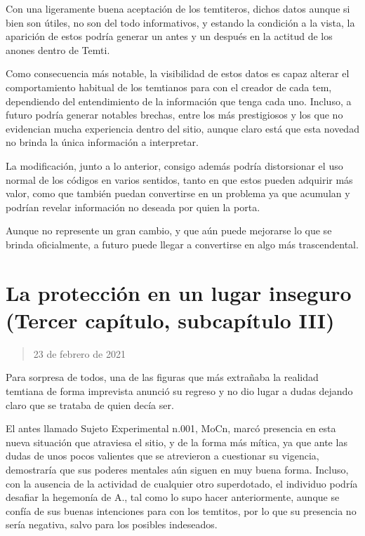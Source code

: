 \documentclass[
  spanish,
]{book}
\begin{document}
Con una ligeramente buena aceptación de los temtiteros, dichos datos aunque si bien son útiles, no son del todo informativos, y estando la condición a la vista, la aparición de estos podría generar un antes y un después en la actitud de los anones dentro de Temti.

Como consecuencia más notable, la visibilidad de estos datos es capaz alterar el comportamiento habitual de los temtianos para con el creador de cada tem, dependiendo del entendimiento de la información que tenga cada uno. Incluso, a futuro podría generar notables brechas, entre los más prestigiosos y los que no evidencian mucha experiencia dentro del sitio, aunque claro está que esta novedad no brinda la única información a interpretar.

La modificación, junto a lo anterior, consigo además podría distorsionar el uso normal de los códigos en varios sentidos, tanto en que estos pueden adquirir más valor, como que también puedan convertirse en un problema ya que acumulan y podrían revelar información no deseada por quien la porta.

Aunque no represente un gran cambio, y que aún puede mejorarse lo que se brinda oficialmente, a futuro puede llegar a convertirse en algo más trascendental.

\hypertarget{la-protecciuxf3n-en-un-lugar-inseguro-tercer-capuxedtulo-subcapuxedtulo-iii}{%
\section{La protección en un lugar inseguro (Tercer capítulo, subcapítulo III)}\label{la-protecciuxf3n-en-un-lugar-inseguro-tercer-capuxedtulo-subcapuxedtulo-iii}}

\begin{quote}
23 de febrero de 2021
\end{quote}

Para sorpresa de todos, una de las figuras que más extrañaba la realidad temtiana de forma imprevista anunció su regreso y no dio lugar a dudas dejando claro que se trataba de quien decía ser.

El antes llamado Sujeto Experimental n.001, MoCn, marcó presencia en esta nueva situación que atraviesa el sitio, y de la forma más mítica, ya que ante las dudas de unos pocos valientes que se atrevieron a cuestionar su vigencia, demostraría que sus poderes mentales aún siguen en muy buena forma. Incluso, con la ausencia de la actividad de cualquier otro superdotado, el individuo podría desafiar la hegemonía de A., tal como lo supo hacer anteriormente, aunque se confía de sus buenas intenciones para con los temtitos, por lo que su presencia no sería negativa, salvo para los posibles indeseados.
\end{document}
